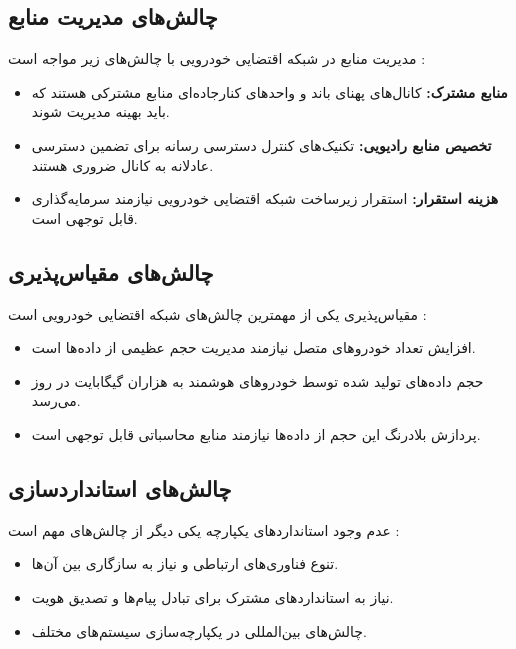 \documentclass[12pt,a4paper]{article}
\begin{document}
\subsection{چالش‌های مدیریت منابع}

مدیریت منابع در شبکه اقتضایی خودرویی با چالش‌های زیر مواجه است \cite{hozouriOverviewVANETVehicular2023, niSecuringFogComputing2018}:

\begin{itemize}
  \item \textbf{منابع مشترک:} کانال‌های پهنای باند و واحدهای کنارجاده‌ای منابع مشترکی هستند که باید بهینه مدیریت شوند.
  \item \textbf{تخصیص منابع رادیویی:} تکنیک‌های کنترل دسترسی رسانه  برای تضمین دسترسی عادلانه به کانال ضروری هستند.
  \item \textbf{هزینه استقرار:} استقرار زیرساخت شبکه اقتضایی خودرویی نیازمند سرمایه‌گذاری قابل توجهی است.
\end{itemize}

\subsection{چالش‌های مقیاس‌پذیری}

مقیاس‌پذیری یکی از مهمترین چالش‌های شبکه اقتضایی خودرویی است \cite{xuInternetVehiclesBig2018}:

\begin{itemize}
  \item افزایش تعداد خودروهای متصل نیازمند مدیریت حجم عظیمی از داده‌ها است.
  \item حجم داده‌های تولید شده توسط خودروهای هوشمند به هزاران گیگابایت در روز می‌رسد.
  \item پردازش بلادرنگ این حجم از داده‌ها نیازمند منابع محاسباتی قابل توجهی است.
\end{itemize}

\subsection{چالش‌های استانداردسازی}

عدم وجود استانداردهای یکپارچه یکی دیگر از چالش‌های مهم است \cite{farsimadanReviewSecurityChallenges2025}:

\begin{itemize}
  \item تنوع فناوری‌های ارتباطی و نیاز به سازگاری بین آن‌ها.
  \item نیاز به استانداردهای مشترک برای تبادل پیام‌ها و تصدیق هویت.
  \item چالش‌های بین‌المللی در یکپارچه‌سازی سیستم‌های مختلف.
\end{itemize}
\end{document}
